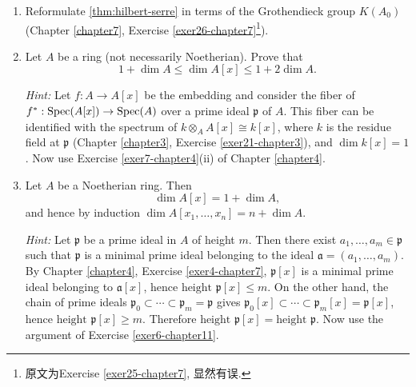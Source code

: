 \begin{enumerate}
    \quad\, Each $\mathfrak{p}_i$ is a prime ideal and therefore the set $S$ is multiplicatively closed. The ring $S^{-1}A$ is Noetherian by Chapter \ref{chapter7}, Exercise \ref{exer9-chapter7}. Each $S^{-1}\mathfrak{p}_i$ has height equal to $m_{i+1} - m_i$, hence $\dim S^{-1}A = \infty$.

    \item \label{exer5-chapter11}Reformulate \eqref{thm:hilbert-serre} in terms of the Grothendieck group $K(A_0)$ (Chapter \ref{chapter7}, Exercise \ref{exer26-chapter7}\footnote{原文为Exercise \ref{exer25-chapter7}, 显然有误.}).

    \item \label{exer6-chapter11}Let $A$ be a ring (not necessarily Noetherian). Prove that
    \[
    1 + \dim A \le \dim A[x] \le 1 + 2 \dim A.
    \]
    
    \textit{Hint:} Let $f: A \to A[x]$ be the embedding and consider the fiber of $f^*: \operatorname{Spec}(A[x]) \to \operatorname{Spec}(A)$ over a prime ideal $\mathfrak{p}$ of $A$. This fiber can be identified with the spectrum of $k \otimes_A A[x] \cong k[x]$, where $k$ is the residue field at $\mathfrak{p}$ (Chapter \ref{chapter3}, Exercise \ref{exer21-chapter3}), and $\dim k[x] = 1$. Now use Exercise \ref{exer7-chapter4}(ii) of Chapter \ref{chapter4}.

    \item \label{exer7-chapter11}Let $A$ be a Noetherian ring. Then
    \[
    \dim A[x] = 1 + \dim A,
    \]
    and hence by induction $\dim A[x_1, \ldots, x_n] = n + \dim A$.

    \textit{Hint:} Let $\mathfrak{p}$ be a prime ideal in $A$ of height $m$. Then there exist $a_1, \ldots, a_m \in \mathfrak{p}$ such that $\mathfrak{p}$ is a minimal prime ideal belonging to the ideal $\mathfrak{a} = (a_1, \ldots, a_m)$. By Chapter \ref{chapter4}, Exercise \ref{exer4-chapter7}, $\mathfrak{p}[x]$ is a minimal prime ideal belonging to $\mathfrak{a}[x]$, hence $\text{height } \mathfrak{p}[x] \leq m$. On the other hand, the chain of prime ideals $\mathfrak{p}_0 \subset \cdots \subset \mathfrak{p}_m = \mathfrak{p}$ gives $\mathfrak{p}_0[x] \subset \cdots \subset \mathfrak{p}_m[x] = \mathfrak{p}[x]$, hence $\text{height } \mathfrak{p}[x] \geq m$. Therefore $\text{height } \mathfrak{p}[x] = \text{height } \mathfrak{p}$. Now use the argument of Exercise \ref{exer6-chapter11}.
\end{enumerate}
